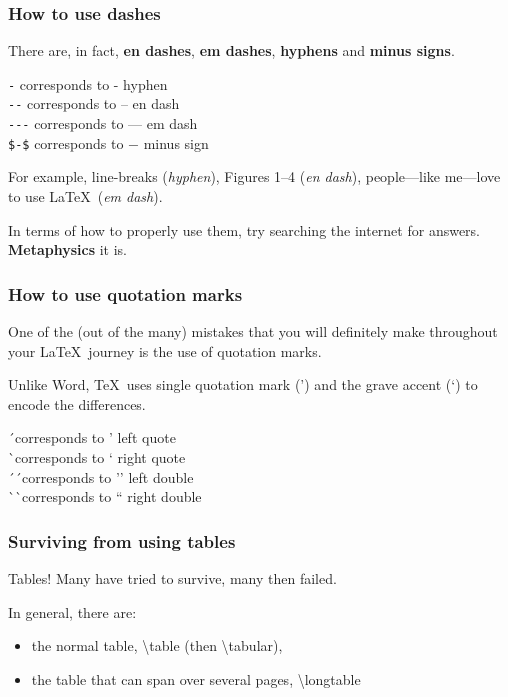 \documentclass[11pt]{beamer}
\begin{document}
\begin{frame}[containsverbatim]
\frametitle{How to use dashes}

There are, in fact, \textbf{en dashes}, \textbf{em dashes}, \textbf{hyphens} and \textbf{minus signs}.

\bigskip

\centering
\verb|-| corresponds to - hyphen\\
\verb|--| corresponds to -- en dash\\
\verb|---| corresponds to --- em dash\\
\verb|$-$| corresponds to $-$ minus sign

\bigskip

\raggedright
For example, line-breaks (\textit{hyphen}), Figures 1--4 (\textit{en dash}), people---like me---love to use \LaTeX \ (\textit{em dash}). 

In terms of how to properly use them, try searching the internet for answers. \textbf{Metaphysics} it is.

\end{frame}

\begin{frame}
\frametitle{How to use quotation marks}

One of the (out of the many) mistakes that you will definitely make throughout your \LaTeX \ journey is the use of quotation marks.

Unlike Word, \TeX \ uses single quotation mark (') and the grave accent (`) to encode the differences.

\bigskip

\centering
\' \ corresponds to ' left quote\\
\` \ corresponds to ` right quote\\
\' \ \' \ corresponds to '' left double\\
\` \ \` \ corresponds to `` right double

\bigskip

\raggedright

\end{frame}

\begin{frame}
	\frametitle{Surviving from using tables}
	
	Tables! Many have tried to survive, many then failed.
	
	\bigskip
	
	In general, there are: 
	
	\begin{itemize}
	\item the normal table, \textbackslash table (then \textbackslash tabular), 
	\item the table that can span over several pages, \textbackslash longtable
	\end{itemize}
\end{frame}
\end{document}
